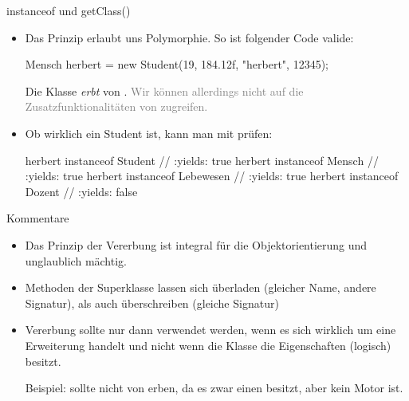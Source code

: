 \begin{frame}[fragile]{instanceof und getClass()}
    \begin{itemize}[<+(1)->]
        \widei
        \item Das Prinzip erlaubt uns Polymorphie.\pause{} So ist folgender Code valide:\pause{}
\begin{plainjava}
Mensch herbert = new Student(19, 184.12f, "herbert", 12345);
\end{plainjava}
        \pause{}Die Klasse  \emph{erbt} von .\pause{} \textcolor{gray}{Wir können allerdings nicht auf die Zusatzfunktionalitäten von  zugreifen.}
        \item Ob  wirklich ein Student ist,\pause{} kann man mit  prüfen:\pause{}
\begin{plainjava}
herbert instanceof Student // :yields: true
herbert instanceof Mensch // :yields: true
herbert instanceof Lebewesen // :yields: true
herbert instanceof Dozent // :yields: false
\end{plainjava}
    \end{itemize}
\end{frame}

\begin{frame}{Kommentare}
    \begin{itemize}[<+(1)->]
        \widei
        \item Das Prinzip der Vererbung ist integral für die Objektorientierung und unglaublich mächtig.
        \item Methoden der Superklasse lassen sich überladen (gleicher Name, andere Signatur),\pause{} als auch überschreiben (gleiche Signatur)
        \item Vererbung sollte nur dann verwendet werden,\pause{} wenn es sich wirklich um eine Erweiterung handelt und nicht wenn die Klasse  die Eigenschaften (logisch) besitzt.\pause{} \medskip\par Beispiel:  sollte nicht von  erben, da es zwar einen besitzt, aber kein Motor ist.
    \end{itemize}
\end{frame}


